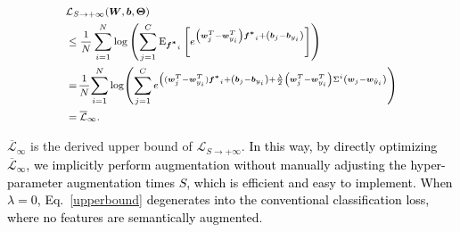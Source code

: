 \documentclass[10pt,journal,compsoc]{IEEEtran}
\newcommand{\revise}[1]{\textcolor{black}{#1}}
\begin{document}

\begin{equation}
\footnotesize
\begin{aligned}
\label{upperbound}
&\mathcal{L}_{S \rightarrow+\infty}(\boldsymbol{W}, \boldsymbol{b}, \boldsymbol{\Theta})  \\
&\leq \frac{1}{N} \sum_{i=1}^{N} \log \left(\sum_{j=1}^{C} \mathrm{E}_{\boldsymbol{{f^{*}}}_{i}}\left[e^{\left(\boldsymbol{w}_{j}^{T}-\boldsymbol{w}_{y_{i}}^{T}\right) \boldsymbol{{f^{*}}}_{i}+\left(\boldsymbol{b}_{j}-\boldsymbol{b}_{y_{i}}\right)}\right]\right) \\
&=\!\frac{1}{N}\! \sum_{i=1}^{N} \log\! \left(\sum_{j=1}^{C} e^{\left((\boldsymbol{w}_{j}^{T}-\boldsymbol{w}_{y_{i}}^{T}) \boldsymbol{{f^{*}}}_{i}+\left(\boldsymbol{b}_{j}-\boldsymbol{b}_{y_{i}}\right)+\frac{\lambda}{2}\left(\boldsymbol{w}_{j}^{T}-\boldsymbol{w}_{y_{i}}^{T}\right) \Sigma^{i}\left(\boldsymbol{w}_{j}-\boldsymbol{w}_{\tilde{y}_{i}}\right)\right.\!}\right) \\
&=\overline{\mathcal{L}}_{\infty}.
\end{aligned}
\end{equation}

$\overline{\mathcal{L}}_{\infty}$ is the derived upper bound of $\mathcal{L}_{S\to+\infty}$.
%
\revise{In this way, by directly optimizing $\overline{\mathcal{L}}_{\infty}$, we implicitly perform augmentation without manually adjusting the hyper-parameter augmentation times $S$, which is efficient and easy to implement.
%
When $\lambda=0$, Eq.~\ref{upperbound} degenerates into the conventional classification loss, where no features are semantically augmented}.
\end{document}
